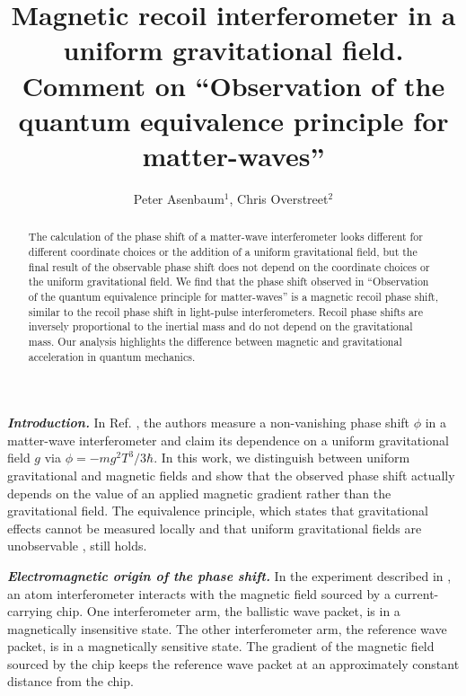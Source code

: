 \documentclass[aps,prl,reprint,onecolumn,nofootinbib,groupedaddress]{revtex4-2}
\begin{document}
\title{Magnetic recoil interferometer in a uniform gravitational field. Comment on ``Observation of the quantum equivalence principle for matter-waves''}


\author{Peter Asenbaum$^{1}$, Chris Overstreet$^{2}$}


\address{$^1$ Institute for Quantum Optics and Quantum Information (IQOQI) Vienna, Austrian Academy of Sciences, Boltzmanngasse 3, 1090 Vienna, Austria.}

\address{$^2$ Department of Physics \& Astronomy, Johns Hopkins University, Baltimore, Maryland 21218, USA}


\begin{abstract}
The calculation of the phase shift of a matter-wave interferometer looks different for different coordinate choices or the addition of a uniform gravitational field, but the final result of the observable phase shift does not depend on the coordinate choices or the uniform gravitational field.
We find that the phase shift observed in ``Observation of the quantum equivalence principle for matter-waves'' is a magnetic recoil phase shift, similar to the recoil phase shift in light-pulse interferometers. Recoil phase shifts are inversely proportional to the inertial mass and do not depend on the gravitational mass. Our analysis highlights the difference between magnetic and gravitational acceleration in quantum mechanics.   
\end{abstract}
\maketitle

\textit{\textbf{Introduction.}} In Ref. \cite{dobkowski2025}, the authors measure a non-vanishing phase shift $\phi$ in a matter-wave interferometer and claim its dependence on a uniform gravitational field $g$ via $\phi = -m g^2 T^3 / 3\hbar$.
In this work, we distinguish between uniform gravitational and magnetic fields and show that the observed phase shift actually depends on the value of an applied magnetic gradient rather than the gravitational field. The equivalence principle, which states that gravitational effects cannot be measured locally and that uniform gravitational fields are unobservable \cite{DiCasola2015,Asenbaum2024}, still holds. 


\textit{\textbf{Electromagnetic origin of the phase shift.}} In the experiment described in \cite{dobkowski2025}, an atom interferometer interacts with the magnetic field sourced by a current-carrying chip.  One interferometer arm, the ballistic wave packet, is in a magnetically insensitive state. The other interferometer arm, the reference wave packet, is in a magnetically sensitive state. The gradient of the magnetic field sourced by the chip keeps the reference wave packet at an approximately constant distance from the chip. 
\end{document}
